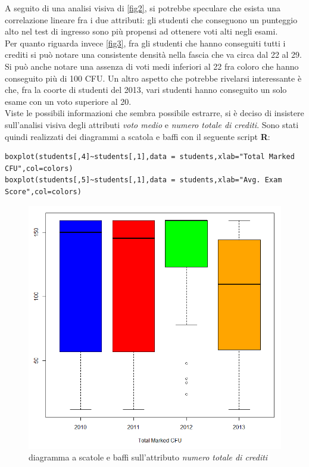 A seguito di una analisi visiva di \ref{fig2}, si potrebbe speculare che esista una correlazione lineare fra i due attributi: gli studenti che conseguono un punteggio alto nel test di ingresso sono più propensi ad ottenere voti alti negli esami. \\

Per quanto riguarda invece \ref{fig3}, fra gli studenti che hanno conseguiti tutti i crediti si può notare una consistente densità nella fascia che va circa dal 22 al 29. Si può anche notare una assenza di voti medi inferiori al 22 fra coloro che hanno conseguito più di 100 CFU. Un altro aspetto che potrebbe rivelarsi interessante è che, fra la coorte di studenti del 2013, vari studenti hanno conseguito un solo esame con un voto superiore al 20. \\

Viste le possibili informazioni che sembra possibile estrarre, si è deciso di insistere sull’analisi visiva degli attributi \textit{voto medio} e \textit{numero totale di crediti}. Sono stati quindi realizzati dei diagrammi a scatola e baffi con il seguente script \textbf{R}: 

\begin{lstlisting}
boxplot(students[,4]~students[,1],data = students,xlab="Total Marked CFU",col=colors)
boxplot(students[,5]~students[,1],data = students,xlab="Avg. Exam Score",col=colors)
\end{lstlisting}

\begin{figure}
    \centering
    \caption{diagramma a scatole e baffi sull'attributo \textit{numero totale di crediti}}
    \label{boxplot1}
	\includegraphics[scale=0.5]{img/box_plot_1.png}
\end{figure}

